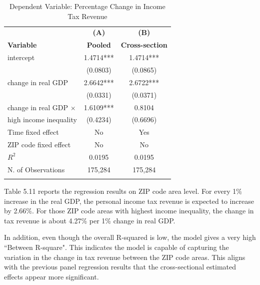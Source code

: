 \documentclass{article}
\begin{document}
\begin{table}[htbp]\centering
\renewcommand\thetable{5.11}
\caption{Dependent Variable: Percentage Change in Income Tax Revenue}
\begin{tabular}{l c c}
\toprule
\textbf{} & \textbf{(A)} & \textbf{(B)} \\ 
\textbf{Variable} & \textbf{Pooled} & \textbf{Cross-section} \\
\midrule
intercept                          &       1.4714*** &  1.4714***  \\
                                   &      (0.0803)   & (0.0865)    \\
change in real GDP                 &       2.6642*** &  2.6722***  \\
                                   &      (0.0331)   & (0.0371)    \\
change in real GDP $\times$        &       1.6109*** &  0.8104     \\
{         high income inequality}  &      (0.4234)   & (0.6696)    \\
\midrule
Time fixed effect                  &       No        &  Yes        \\
ZIP code fixed effect              &       No        &  No         \\
\midrule
\textbf{$R^2$}                     &       0.0195    &  0.0195     \\
N. of Observations                 &       175,284   &  175,284    \\         
\bottomrule
\addlinespace[1ex]
\multicolumn{3}{l}{\textsuperscript{***}$p<0.01$, 
  \textsuperscript{**}$p<0.05$, 
  \textsuperscript{*}$p<0.1$}
\end{tabular}
\end{table}

Table 5.11 reports the regression results on ZIP code area level. For every 1\% increase in the real GDP, the personal income tax revenue is expected to increase by 2.66\%. For those ZIP code areas with highest income inequality, the change in tax revenue is about 4.27\% per 1\% change in real GDP. 

In addition, even though the overall R-squared is low, the model gives a very high ``Between R-square". This indicates the model is capable of capturing the variation in the change in tax revenue between the ZIP code areas. This aligns with the previous panel regression results that the cross-sectional estimated effects appear more significant. 
\end{document}
